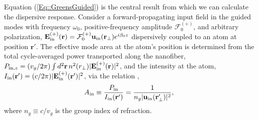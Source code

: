 \documentclass[aps,pra,twocolumn]{revtex4-1} %
\newcommand{\inp}{{\rm in}}
\newcommand{\Eamp}{\mathcal{F}_0^{(+)}}
\begin{document}
Equation (\ref{Eq::GreensGuided}) is the central result from which we can calculate the dispersive response.  Consider a forward-propagating input field in the guided modes with frequency $\omega_0$, positive-frequency amplitude $\Eamp$, and arbitrary polarization, $\mathbf{E}^{(+)}_{\inp}(\br) = \Eamp  \mathbf{u}_{\rm in}(\br_\perp) e^{i \beta_0 z}$ dispersively coupled to an atom at position $\mathbf{r}'$.  The effective mode area at the atom's position is determined from the total cycle-averaged power transported along the nanofiber, $P_{{\rm in},z} = (v_g/2\pi) \int d^2\br \, n^2(r_\perp) |\mathbf{E}^{(+)}_{\inp}(\br) |^2$, and the intensity at the atom, $I_{\rm in}(\mathbf{r}') = (c/2\pi) |\mathbf{E}^{(+)}_{\inp}(\br') |^2$, via the relation \cite{domokos_quantum_2002},
 	\begin{align} \label{Eq::AreaIn}
 		A_{\rm in} \equiv \frac{P_{{\rm in}}}{I_{\rm in}(\mathbf{r}')} = \frac{1}{n_g |\mathbf{u}_{\rm in}(\mathbf{r}'_\perp)|^{2}},
	\end{align}
where $n_g\equiv c/v_g$ is the group index of refraction.    
\end{document}
